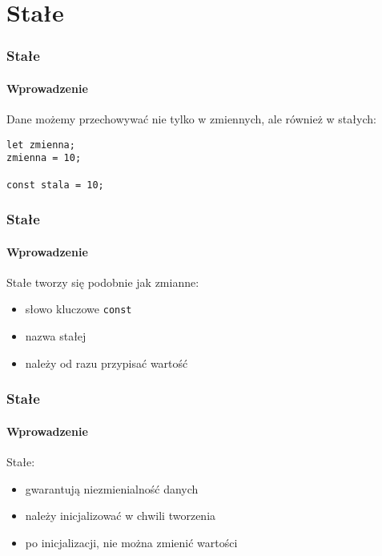 \section{Stałe}

\begin{frame}[fragile]
  \frametitle{Stałe}
  \framesubtitle{Wprowadzenie}

  Dane możemy przechowywać nie tylko w zmiennych, ale również w stałych:

  \begin{verbatim}
let zmienna;
zmienna = 10;

const stala = 10;
  \end{verbatim}

\end{frame}


\begin{frame}[fragile]
  \frametitle{Stałe}
  \framesubtitle{Wprowadzenie}

  Stałe tworzy się podobnie jak zmianne:

  \begin{itemize}
    \item słowo kluczowe \verb|const|
    \item nazwa stałej
    \item należy od razu przypisać wartość
  \end{itemize}

\end{frame}


\begin{frame}[fragile]
  \frametitle{Stałe}
  \framesubtitle{Wprowadzenie}

  Stałe:

  \begin{itemize}
    \item gwarantują niezmienialność danych
    \item należy inicjalizować w chwili tworzenia
    \item po inicjalizacji, nie można zmienić wartości
  \end{itemize}

\end{frame}
